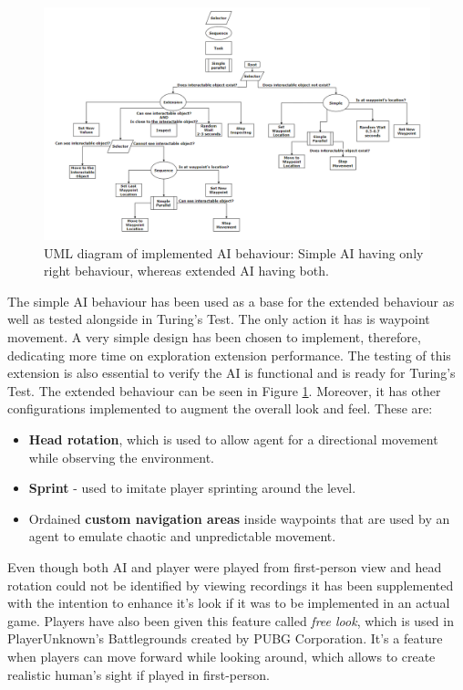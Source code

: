 \documentclass[journal]{IEEEtran}
\begin{document}
\begin{figure}
	\includegraphics[width=\linewidth]{Images/ImplementedAI.PNG}
	\caption{UML diagram of implemented AI behaviour: Simple AI having only right behaviour, whereas extended AI having both.}
	\label{fig:implementedAI}
\end{figure}

The simple AI behaviour has been used as a base for the extended behaviour as well as tested alongside in Turing's Test. The only action it has is waypoint movement. A very simple design has been chosen to implement, therefore, dedicating more time on exploration extension performance. The testing of this extension is also essential to verify the AI is functional and is ready for Turing's Test. The extended behaviour can be seen in Figure \ref{fig:implementedAI}. Moreover, it has other configurations implemented to augment the overall look and feel. These are: 

\begin{itemize}
	\item \textbf{Head rotation}, which is used to allow agent for a directional movement while observing the environment.
	\item \textbf{Sprint} - used to imitate player sprinting around the level.
	\item Ordained \textbf{custom navigation areas} inside waypoints that are used by an agent to emulate chaotic and unpredictable movement.
\end{itemize}

Even though both AI and player were played from first-person view and head rotation could not be identified by viewing recordings it has been supplemented with the intention to enhance it's look if it was to be implemented in an actual game. Players have also been given this feature called \textit{free look}, which is used in PlayerUnknown's Battlegrounds created by PUBG Corporation. It's a feature when players can move forward while looking around, which allows to create realistic human's sight if played in first-person. 
\end{document}

